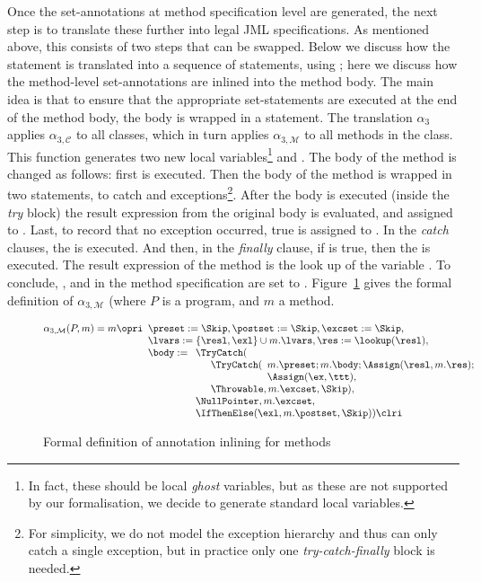Once the set-annotations at method specification level are generated,
the next step is to translate these further into legal JML
specifications. As mentioned above, this consists of two steps that
can be swapped. Below we discuss how the \CaseJML statement is
translated into a sequence of \Set statements, using \CondExpr;
here we discuss how the method-level set-annotations are inlined into
the method body. The main idea is that to ensure that the appropriate
set-statements are executed at the end of the method body, the body is
wrapped in a \TryCatch statement. The translation \(\alpha_3\) applies
\(\alpha_{3, \mathcal{C}}\) to all classes, which in turn applies
\(\alpha_{3, \mathcal{M}}\) to all methods in the class. This function
generates two new local variables\footnote{In fact, these should be
local \emph{ghost} variables, but as these are not supported by our
formalisation, we decide to generate standard local variables.} \resl
and \exl. The body of the method is changed as follows: first \preset
is executed. Then the body of the method is wrapped in two \TryCatch
statements, to catch \Throwable and \NullPointer
exceptions\footnote{For simplicity, we do not model the exception
hierarchy and thus \TryCatch can only catch a single
exception, but in practice only one \emph{try-catch-finally} block is needed.}.
After the body is executed (inside the \emph{try} block)
the result expression from the original body is evaluated, and
assigned to \resl. Last, to record that no exception occurred, true is
assigned to \exl. In the \emph{catch} clauses, the \excset is
executed. And then, in the \emph{finally} clause, if \resl is true,
then the \postset is executed. The result expression of the method is
the look up of the variable \resl. To conclude, \preset, \postset and
\excset in the method specification are set to
\Skip. Figure~\ref{FigInline} gives the formal definition of
\(\alpha_{3, \mathcal{M}}\) (where \(P\) is a program, and \(m\) a method.

\begin{figure}[t]
\[
\alpha_{3, \mathcal{M}}(P, m) = m \opri
\begin{array}[t]{l}
\preset := \Skip, \postset := \Skip, \excset := \Skip,\\
\lvars := \{\resl, \exl\} \cup m.\lvars,
\res := \lookup(\resl), \\
\body :=
\begin{array}[t]{l}
\TryCatch(\\
\quad \begin{array}[t]{l}
  \TryCatch(
  \begin{array}[t]{l}
   m.\preset; m.\body; \Assign(\resl, m.\res); \\
   \Assign(\ex, \ttt),
  \end{array}\\
  \Throwable, m.\excset, \Skip),
\end{array}\\
\NullPointer, m.\excset,\\
\IfThenElse(\exl, m.\postset, \Skip)) \clri
\end{array}
\end{array}
\]
\caption{Formal definition of annotation inlining for methods}\label{FigInline}
\end{figure}


